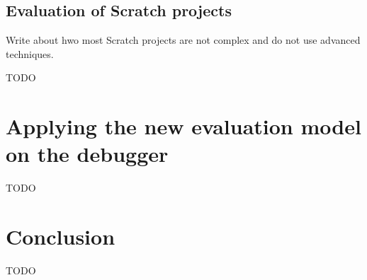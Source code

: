 \documentclass[../main]{subfiles}
\begin{document}
\subsection{Evaluation of Scratch projects}\label{subsec:evaluation-of-scratch-projects}

Write about hwo most Scratch projects are not complex and do not use advanced techniques.


TODO

\section{Applying the new evaluation model on the debugger}\label{sec:applying-the-new-evaluation-model-on-the-debugger}

TODO

\section{Conclusion}\label{sec:conclusion}

TODO
\end{document}
